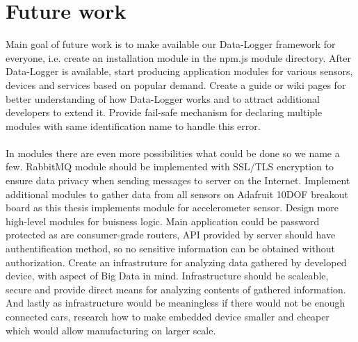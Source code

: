 \section{Future work} %
\label{sec:future_work}
Main goal of future work is to make available our Data-Logger framework for everyone, i.e. create an installation module in the npm.js module directory. After Data-Logger is available, start producing application modules for various sensors, devices and services based on popular demand. Create a guide or wiki pages for better understanding of how Data-Logger works and to attract additional developers to extend it. Provide fail-safe mechanism for declaring multiple modules with same identification name to handle this error.\\\\
In modules there are even more possibilities what could be done so we name a few. RabbitMQ module should be implemented with SSL/TLS encryption to ensure data privacy when sending messages to server on the Internet. Implement additional modules to gather data from all sensors on Adafruit 10DOF breakout board as this thesis implements module for accelerometer sensor. Design more high-level modules for buisness logic.
Main application could be password protected as are consumer-grade routers, API provided by server should have authentification method, so no sensitive information can be obtained without authorization. Create an infrastruture for analyzing data gathered by developed device, with aspect of Big Data in mind. Infrastructure should be scaleable, secure and provide direct means for analyzing contents of gathered information. And lastly as infrastructure would be meaningless if there would not be enough connected cars, research how to make embedded device smaller and cheaper which would allow manufacturing on larger scale.
